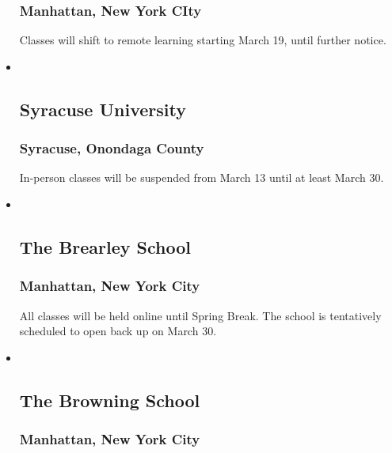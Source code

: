 \begin{itemize}
  \hypertarget{manhattan-new-york-city-10}{%
  \subsubsection{Manhattan, New York
  CIty}\label{manhattan-new-york-city-10}}

  Classes will shift to remote learning starting March 19, until further
  notice.
\item ~
  \hypertarget{syracuse-university}{%
  \subsection{Syracuse University}\label{syracuse-university}}

  \hypertarget{syracuse-onondaga-county}{%
  \subsubsection{Syracuse, Onondaga
  County}\label{syracuse-onondaga-county}}

  In-person classes will be suspended from March 13 until at least March
  30.
\item ~
  \hypertarget{the-brearley-school}{%
  \subsection{The Brearley School}\label{the-brearley-school}}

  \hypertarget{manhattan-new-york-city-11}{%
  \subsubsection{Manhattan, New York
  City}\label{manhattan-new-york-city-11}}

  All classes will be held online until Spring Break. The school is
  tentatively scheduled to open back up on March 30.
\item ~
  \hypertarget{the-browning-school}{%
  \subsection{The Browning School}\label{the-browning-school}}

  \hypertarget{manhattan-new-york-city-12}{%
  \subsubsection{Manhattan, New York
  City}\label{manhattan-new-york-city-12}}


\end{itemize}
